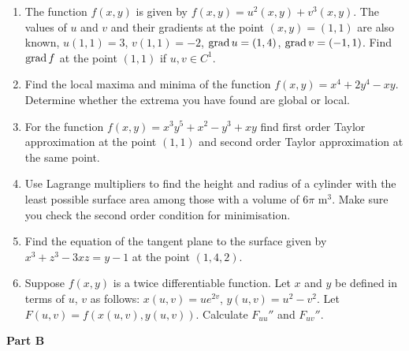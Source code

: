 \begin{enumerate}

\item The function $f(x,y)$ is given by $f(x,y)=u^2(x,y)+v^3(x,y)$. The values of $u$ and $v$ and their gradients at the point $(x,y)=(1,1)$ are also known, $u(1,1)=3$, $v(1,1)=-2$, $\mathrm{grad}\, u=(1,4)$, $\mathrm{grad}\, v=(-1,1)$. Find $\mathrm{grad}\, f$ at the point $(1,1)$ if $u,v \in C^1$.

\item Find the local maxima and minima of the function $f(x,y)=x^4+2y^4-xy$. Determine whether the extrema you have found are global or local.

\item For the function $f(x,y)=x^3y^5+x^2-y^3+xy$ find first order Taylor approximation at the point $(1,1)$ and second order Taylor approximation at the same point.

\item Use Lagrange multipliers to find the height and radius of a cylinder with the least possible
surface area among those with a volume of $6\pi$ m$^3$. Make sure you check the second order
condition for minimisation.

\item Find the equation of the tangent plane to the surface given by $x^3+z^3-3xz=y-1$ at the point $(1, 4, 2)$.

\item Suppose $f(x,y)$ is a twice differentiable function. Let $x$ and $y$ be defined in terms of $u$, $v$ as follows: $x(u,v)=ue^{2v}$, $y(u,v)=u^2-v^2$. Let $F(u,v)=f(x(u, v), y(u, v))$.
Calculate $F_{uu}''$ and $F_{uv}''$.

\end{enumerate}

\textbf{Part B}


